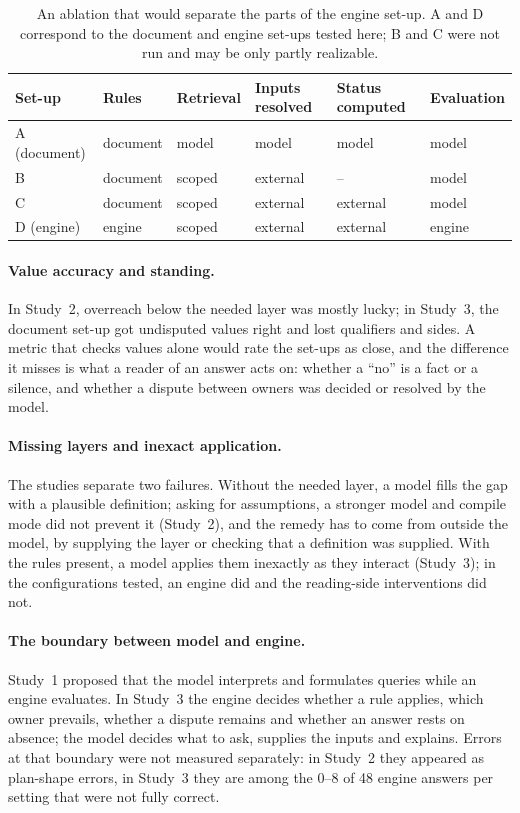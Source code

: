 \documentclass[11pt]{article}
\begin{document}
\begin{table}[t]
\centering\small
\caption{An ablation that would separate the parts of the engine set-up. A and D correspond to the document and
engine set-ups tested here; B and C were not run and may be only partly realizable.}
\label{tab:ablation}
\begin{tabular}{llllll}
\toprule
Set-up & Rules & Retrieval & Inputs resolved & Status computed & Evaluation\\
\midrule
A (document) & document & model & model & model & model\\
B & document & scoped & external & -- & model\\
C & document & scoped & external & external & model\\
D (engine) & engine & scoped & external & external & engine\\
\bottomrule
\end{tabular}
\end{table}

\paragraph{Value accuracy and standing.} In Study~2, overreach below the needed layer was mostly lucky; in Study~3,
the document set-up got undisputed values right and lost qualifiers and sides. A metric that checks values alone
would rate the set-ups as close, and the difference it misses is what a reader of an answer acts on: whether a
``no'' is a fact or a silence, and whether a dispute between owners was decided or resolved by the model.

\paragraph{Missing layers and inexact application.} The studies separate two failures. Without the needed layer, a
model fills the gap with a plausible definition; asking for assumptions, a stronger model and compile mode did not
prevent it (Study~2), and the remedy has to come from outside the model, by supplying the layer or checking that a
definition was supplied. With the rules present, a model applies them inexactly as they interact (Study~3); in the
configurations tested, an engine did and the reading-side interventions did not.

\paragraph{The boundary between model and engine.} Study~1 proposed that the model interprets and formulates queries
while an engine evaluates. In Study~3 the engine decides whether a rule applies, which owner prevails, whether a
dispute remains and whether an answer rests on absence; the model decides what to ask, supplies the inputs and
explains. Errors at that boundary were not measured separately: in Study~2 they appeared as plan-shape errors, in
Study~3 they are among the 0--8 of 48 engine answers per setting that were not fully correct.
\end{document}
